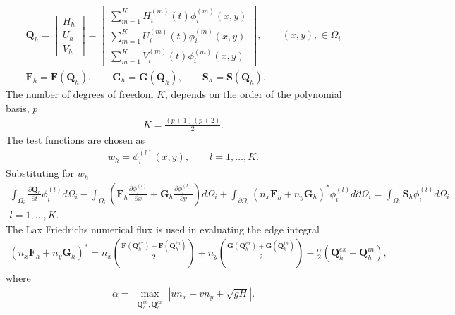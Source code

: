 \documentclass[11pt]{article}
\begin{document}
\begin{gather}
\mathbf{Q}_h = \begin{bmatrix} H_h \\ U_h \\ V_h \end{bmatrix} = \begin{bmatrix} \displaystyle\sum_{m=1}^{K}H_i^{(m)}(t)\phi_i^{(m)}(x,y) \\ \displaystyle\sum_{m=1}^{K}U_i^{(m)}(t)\phi_i^{(m)}(x,y) \\ \displaystyle\sum_{m=1}^{K}V_i^{(m)}(t)\phi_i^{(m)}(x,y)\end{bmatrix}, \quad\quad (x,y), \in \Omega_i \\  \mathbf{F}_h = \mathbf{F}(\mathbf{Q}_h), \quad\quad \mathbf{G}_h = \mathbf{G}(\mathbf{Q}_h), \quad\quad \mathbf{S}_h = \mathbf{S}(\mathbf{Q}_h),
\end{gather}
The number of degrees of freedom $K$, depends on the order of the polynomial basis, $p$
\begin{gather}
K = \frac{(p+1)(p+2)}{2}  . 
\end{gather}
The test functions are chosen as
\begin{align}
w_h = \phi_i^{(l)}(x,y),\quad \quad l = 1,\ldots,K.
\end{align}
Substituting for $w_h$
\begin{multline}
\int_{\Omega_i}\frac{\partial \mathbf{Q}_h}{\partial t}\phi_i^{(l)} d\Omega_i - \int_{\Omega_i}\left(\mathbf{F}_h\frac{\partial \phi_i^{(l)}}{\partial x} + \mathbf{G}_h\frac{\partial \phi_i^{(l)}}{\partial y} \right)d\Omega_i + \int_{\partial \Omega_i} \left(n_x\mathbf{F}_h + n_y\mathbf{G}_h\right)^*\phi_i^{(l)} d\partial \Omega_i= \int_{\Omega_i}\mathbf{S}_h\phi_i^{(l)} d\Omega_i \\ l = 1,\ldots,K.
\end{multline}
The Lax Friedrichs numerical flux is used in evaluating the edge integral
\begin{align}
\left(n_x\mathbf{F}_h + n_y\mathbf{G}_h\right)^* = n_x\left(\frac{\mathbf{F}(\mathbf{Q}_h^{ex}) + \mathbf{F}(\mathbf{Q}_h^{in})}{2}\right) + n_y\left(\frac{\mathbf{G}(\mathbf{Q}_h^{ex}) + \mathbf{G}(\mathbf{Q}_h^{in})}{2}\right) -\frac{\alpha}{2}\left(\mathbf{Q}_h^{ex}-\mathbf{Q}_h^{in}\right),
\end{align}
where 
\begin{align}
\alpha = \max_{\substack{\mathbf{Q}_h^{in},\mathbf{Q}_h^{ex}}}\left|un_x + vn_y + \sqrt{gH}\right|.
\end{align}
\end{document}
